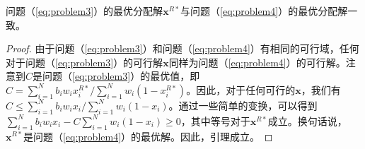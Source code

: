 	\begin{lm}\label{lm:equivalence}
		问题（\ref{eq:problem3}）的最优分配解$\mathbf{x}^{R*}$与问题（\ref{eq:problem4}）的最优分配解一致。
	\end{lm}
	\begin{proof}
		由于问题（\ref{eq:problem3}）和问题（\ref{eq:problem4}）有相同的可行域，任何对于问题（\ref{eq:problem3}）的可行解$\mathbf{x}$同样为问题（\ref{eq:problem4}）的可行解。注意到$C$是问题（\ref{eq:problem3}）的最优值，即$C=\sum_{i=1}^{N}b_iw_ix_i^{R*}/\sum_{i=1}^{N}w_i(1-x_i^{R*})$。因此，对于任何可行的$\mathbf{x}$，我们有$C\le\sum_{i=1}^{N}b_iw_ix_i/\sum_{i=1}^{N}w_i(1-x_i)$。通过一些简单的变换，可以得到$\sum_{i=1}^{N}b_iw_ix_i-C\sum_{i=1}^{N}w_i(1-x_i)\ge 0$，其中等号对于$\mathbf{x}^{R*}$成立。换句话说，$\mathbf{x}^{R*}$是问题（\ref{eq:problem4}）的最优解。因此，引理成立。		
	\end{proof}
	
